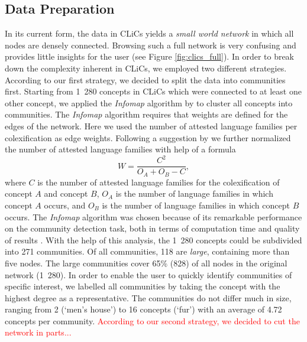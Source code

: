 \subsection{Data Preparation}
In its current form, the data in CLiCs yields a \emph{small world network} in which all nodes are
densely connected. Browsing such a full network is very confusing and provides little insights for
the user (see Figure \ref{fig:clics_full}). In order to break down the complexity inherent in CLiCs,
we employed two different strategies. According to our first strategy, we decided to split the data
into communities first.
Starting from 1~280 concepts in CLiCs which
were connected to at least one other concept, we applied the \emph{Infomap} algorithm by
 to cluster all concepts into communities.
The \emph{Infomap} algorithm requires that weights are defined for the edges of the network.
Here we used the number of attested language families per colexification as edge weights. Following
a suggestion by  we
further normalized the number of attested language families with help of a formula
\begin{equation}
    W = \frac{C^2}{O_A+O_B - C},
\end{equation}
where $C$ is the number of attested language families for the colexification of concept $A$ and
concept $B$, $O_A$ is the number of language families in which concept $A$ occurs, and $O_B$ is the
number of language families in which concept $B$ occurs. 
The \emph{Infomap} algorithm was chosen because of
its remarkable performance on the community detection task, both in terms of computation time and
quality of results \cite{Lancichinetti2009}.
With the help of this analysis, the 1~280 concepts
could be subdivided into 271 communities. 
Of all communities, 118 are \emph{large}, containing more than
five nodes. The large communities cover 65\% (828) of all nodes in the original network (1~280). In
order to enable the user to quickly identify communities of specific interest, we labelled all
communities by taking the concept with the highest degree as a representative. 
The communities do not differ much in size, ranging from 2 (`men's house') to 16 concepts (`{fur}')
with an average of 4.72 concepts per community. 
\textcolor{red}{According to our second strategy, we decided to cut the network in parts...}

